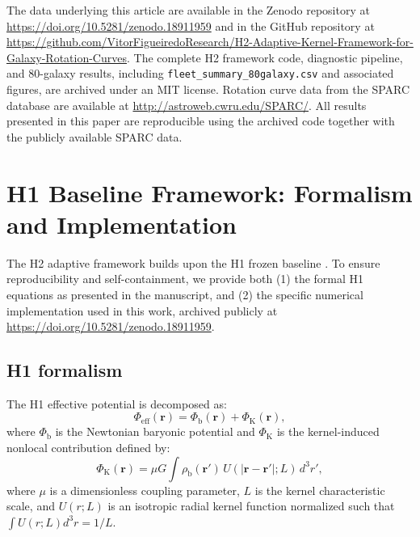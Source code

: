 \documentclass[twocolumn,linenumbers]{aastex701}
\begin{document}
The data underlying this article are available in the Zenodo repository at
\url{https://doi.org/10.5281/zenodo.18911959} and in the GitHub repository
at \url{https://github.com/VitorFigueiredoResearch/H2-Adaptive-Kernel-Framework-for-Galaxy-Rotation-Curves}.
The complete H2 framework code, diagnostic pipeline, and 80-galaxy results,
including \texttt{fleet\_summary\_80galaxy.csv} and associated figures, are
archived under an MIT license. Rotation curve data from the SPARC database
\citep{lelli2016} are available at \url{http://astroweb.cwru.edu/SPARC/}.
All results presented in this paper are reproducible using the archived code
together with the publicly available SPARC data.


\appendix

\section{H1 Baseline Framework: Formalism and Implementation}
\label{app:h1}

The H2 adaptive framework builds upon the H1 frozen baseline
\citep{figueiredo2024_h1, figueiredo2024_h1p5}. To ensure reproducibility
and self-containment, we provide both (1) the formal H1 equations as
presented in the manuscript, and (2) the specific numerical implementation
used in this work, archived publicly at
\href{https://doi.org/10.5281/zenodo.18911959}{https://doi.org/10.5281/zenodo.18911959}.

\subsection{H1 formalism}

The H1 effective potential is decomposed as:
\begin{equation}
	\Phi_{\mathrm{eff}}(\mathbf{r}) = \Phi_{\mathrm{b}}(\mathbf{r}) +
	\Phi_{\mathrm{K}}(\mathbf{r}),
	\label{eq:phi_eff}
\end{equation}
where $\Phi_{\mathrm{b}}$ is the Newtonian baryonic potential and
$\Phi_{\mathrm{K}}$ is the kernel-induced nonlocal contribution defined by:
\begin{equation}
	\Phi_{\mathrm{K}}(\mathbf{r}) = \mu G \int \rho_{\mathrm{b}}(\mathbf{r}')
	\, U(|\mathbf{r} - \mathbf{r}'|; L) \, d^3r',
	\label{eq:convolution}
\end{equation}
where $\mu$ is a dimensionless coupling parameter, $L$ is the kernel
characteristic scale, and $U(r;L)$ is an isotropic radial kernel function
normalized such that $\int U(r;L) d^3r = 1/L$.
\end{document}

